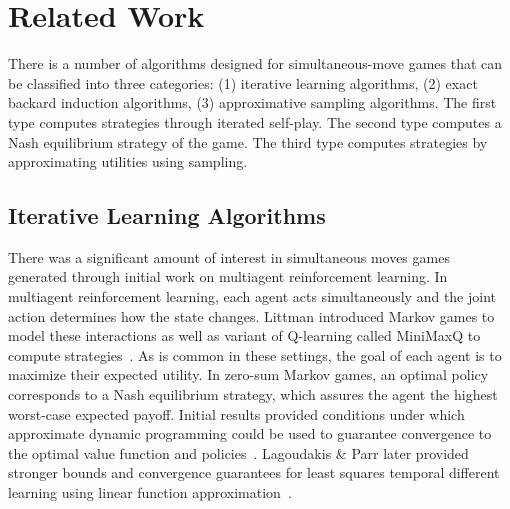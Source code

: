 
\section{Related Work}


There is a number of algorithms designed for simultaneous-move games that can be classified into three categories: 
(1) iterative learning algorithms, 
(2) exact backard induction algorithms, 
(3) approximative sampling algorithms.
The first type computes strategies through iterated self-play.
The second type computes a Nash equilibrium strategy of the game. 
The third type computes strategies by approximating utilities using sampling. 


\subsection{Iterative Learning Algorithms}



There was a significant amount of interest in simultaneous moves games generated through initial work 
on multiagent reinforcement learning. In multiagent reinforcement learning, each agent acts simultaneously and 
the joint action determines how the state changes. Littman introduced Markov games to model these interactions 
as well as variant of Q-learning called MiniMaxQ to compute strategies~\cite{Littman94markovgames,Littman01Value}.
As is common in these settings, the goal of each agent is to maximize their expected utility. 
In zero-sum Markov games, an optimal policy corresponds to a Nash equilibrium strategy, which assures the agent 
the highest worst-case expected payoff. Initial results provided conditions under which approximate dynamic 
programming could be used to guarantee convergence to the optimal value function and 
policies~\cite{Littman96ageneralized}. Lagoudakis \& Parr later provided stronger bounds and convergence guarantees
for least squares temporal different learning using linear function approximation~\cite{Lagoudakis02}. 


